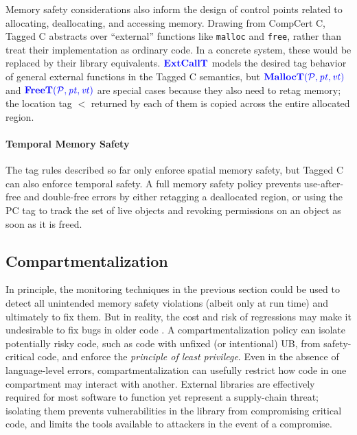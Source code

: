 \documentclass{llncs}
\begin{document}
Memory safety considerations also inform the design of control points related to allocating,
deallocating, and accessing memory.
Drawing from CompCert C, Tagged C abstracts over
``external'' functions like {\tt malloc} and {\tt free}, rather than treat their implementation as
ordinary code. In a concrete system, these would be replaced by their library equivalents. 
\(\color{blue} \mathbf{ExtCallT}\) models the desired tag behavior of general external functions in the Tagged C
semantics, but \(\color{blue} \mathbf{MallocT}(\mathcal{\color{blue} P\mathit{}}, \mathit{\color{blue} pt}, \mathit{\color{blue} vt})\) and \(\color{blue} \mathbf{FreeT}(\mathcal{\color{blue} P\mathit{}},\mathit{\color{blue} pt},\mathit{\color{blue} vt})\) are special cases because they also need to retag memory;
the location tag \(\lt\) returned by each of them is copied across the entire allocated region.

\paragraph*{Temporal Memory Safety}

The tag rules described so far only enforce spatial memory safety, but Tagged C can 
also enforce temporal safety. A full memory safety policy prevents use-after-free and
double-free errors by either retagging a deallocated region, or using the PC tag
to track the set of live objects and revoking permissions on an object as soon as it is freed.

\subsection{Compartmentalization}
\label{sec:compartments}

In principle, the monitoring techniques in the previous section could be used
to detect all unintended memory safety violations (albeit only at run time) and ultimately to fix them.
But in reality, the cost and risk of regressions may make it
undesirable to fix bugs in older code \cite{Bessey10:Coverity}.  
%
A compartmentalization policy can isolate potentially risky code, such as code with unfixed
(or intentional) UB, from safety-critical code, and enforce the {\em principle of least privilege}. 
Even in the absence of language-level errors, compartmentalization can usefully 
restrict how code in one compartment may interact with another. External libraries are
effectively required for most software to function yet represent a supply-chain threat; isolating 
them prevents vulnerabilities in the library from compromising critical code,
and limits the tools available to attackers in the event of a compromise.
\end{document}
